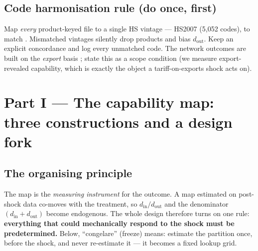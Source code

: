 \documentclass[11pt]{article}
\newcommand{\din}{d_{\mathrm{in}}}
\newcommand{\dout}{d_{\mathrm{out}}}
\begin{document}
\subsection{Code harmonisation rule (do once, first)}
Map \emph{every} product-keyed file to a single HS vintage --- HS2007 (5{,}052
codes), to match \citet{fontagne2022}. Mismatched vintages silently drop products
and bias $\dout$. Keep an explicit concordance and log every unmatched code. The
network outcomes are built on the \emph{export} basis \citep[not production:][]{destefano2025};
state this as a scope condition (we measure export-revealed capability, which is
exactly the object a tariff-on-exports shock acts on).

\section{Part I --- The capability map: three constructions and a design fork}
\label{part:map}

\subsection{The organising principle}
The map is the \emph{measuring instrument} for the outcome. A map estimated on
post-shock data co-moves with the treatment, so $\din/\dout$ and the denominator
$(\din+\dout)$ become endogenous. The whole design therefore turns on one rule:
\textbf{everything that could mechanically respond to the shock must be
predetermined.} Below, ``congelare'' (freeze) means: estimate the partition once,
before the shock, and never re-estimate it --- it becomes a fixed lookup grid.
\end{document}
